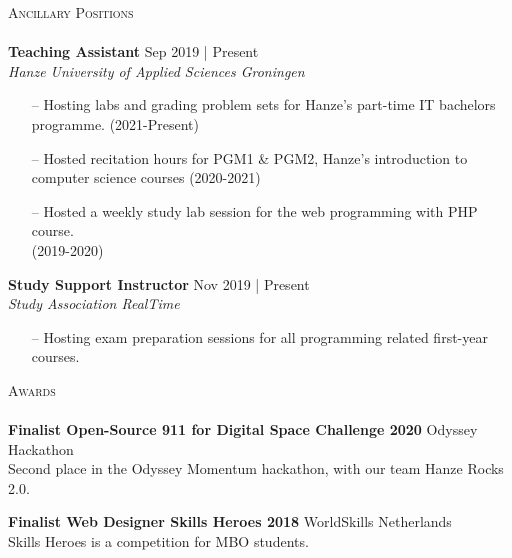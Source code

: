 \documentclass[a4paper]{article}
\newcommand{\lineunder} {
    \vspace*{-8pt} \\
    \hspace*{-18pt} \hrulefill \\
}
\newcommand{\header} [1] {
    {\hspace*{-18pt}\vspace*{6pt} \textsc{#1}}
    \vspace*{-6pt} \lineunder
}
\begin{document}
\header{Ancillary Positions}
\vspace{1mm}
\textbf{Teaching Assistant} \hfill \color{gray}Sep 2019 | Present\color{black}\\
\textit{Hanze University of Applied Sciences Groningen}\\
\vspace{-2mm}
\begin{itemize} \itemsep 1pt
	\item[--] Hosting labs and grading problem sets for Hanze’s part-time IT bachelors programme. \color{gray}(2021-Present)\color{black}
	\item[--] Hosted recitation hours for PGM1 & PGM2, Hanze’s introduction to computer science courses \color{gray}(2020-2021)\color{black}
	\item[--]Hosted a weekly study lab session for the web programming with PHP course.\\\color{gray}(2019-2020)\color{black}
\end{itemize}
\textbf{Study Support Instructor} \hfill \color{gray}Nov 2019 | Present\color{black}\\
\textit{Study Association RealTime}\\
\vspace{-2mm}
\begin{itemize} \itemsep 1pt
	\item[--] Hosting exam preparation sessions for all programming related first-year courses.
\end{itemize}

\vspace{2mm}

\vspace{5mm}

\header{Awards}
\textbf{Finalist Open-Source 911 for Digital Space Challenge 2020} \hfill Odyssey Hackathon\\
Second place in the Odyssey Momentum hackathon, with our team Hanze Rocks 2.0.
\vspace*{2mm}

\textbf{Finalist Web Designer Skills Heroes 2018} \hfill WorldSkills Netherlands\\
Skills Heroes is a competition for MBO students.
\vspace*{2mm}

\ 
\end{document}
